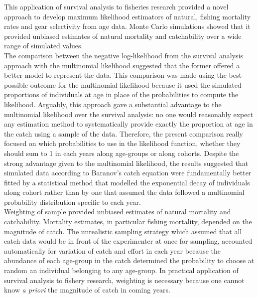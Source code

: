 This application of survival analysis to fisheries research provided a novel approach to develop maximum likelihood estimators of natural, fishing mortality rates and gear selectivity from age data. Monte Carlo simulations showed that it provided unbiased estimates of natural mortality and catchability over a wide range of simulated values. \\

The comparison between the negative log-likelihood from the survival analysis approach with the multinomial likelihood \citep{Four82a} suggested that the former offered a better model to represent the data. This comparison was made using the best possible outcome for the multinomial likelihood because it used the simulated proportions of individuals at age in place of the probabilities to compute the likelihood. Arguably, this approach gave a substantial advantage to the multinomial likelihood over the survival analysis: no one would reasonably expect any estimation method to systematically provide exactly the proportion at age in the catch using a sample of the data. Therefore, the present comparison really focused on which probabilities to use in the likelihood function, whether they should sum to 1 in each years along age-groups or along cohorts. Despite the strong advantage given to the multinomial likelihood, the results suggested that simulated data according to Baranov's catch equation were fundamentally better fitted by a statistical method that modelled the exponential decay of individuals along cohort rather than by one that assumed the data followed a multinomial probability distribution specific to each year.\\

Weighting of sample provided unbiased estimates of natural mortality and catchability. Mortality estimates, in particular fishing mortality, depended on the magnitude of catch. The unrealistic sampling strategy which assumed that all catch data would be in front of the experimenter at once for sampling, accounted automatically for variation of catch and effort in each year because the abundance of each age-group in the catch determined the probability to choose at random an individual belonging to any age-group. In practical application of survival analysis to fishery research, weighting is necessary because one cannot know {\it a priori} the magnitude of catch in coming years. \\


